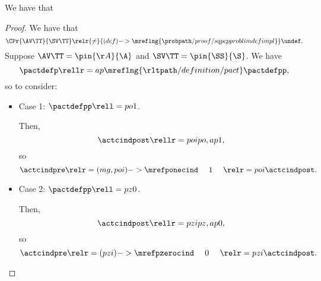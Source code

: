 \begin{proposition}
  We have that %
\end{proposition}

\begin{proof}
  We have that
  $$\CPr{\AV\TT}{\SV\TT} \relr {\ne} {(def)->\mreflng{\probpath/proof/sqpcpproblimdefimpl}} \undef,$$
  Suppose 
  $\AV\TT = \pin{\AA}{\A}$
  and
  $\SV\TT = \pin{\SS}{\S}$. We have
  $$\pactdefp \rellr = ap {\mreflng{\rltpath/definition/pact}} \pactdefpp,$$
  so  to consider:
  \begin{itemize}
    \item {} Case 1: $\pactdefpp \rell = po 1$.

      Then,
      $$\actcindpost \rellr = poi po,ap 1,$$
      so
      $$\actcindpre \relr = (mg,poi)->{\mrefponecind} \ \ \ \ 1\ \ \ \ \relr = poi \actcindpost.$$
    \item {} Case 2: $\pactdefpp \rell = pz 0$.

      Then,
      $$\actcindpost \rellr = pzi pz,ap 0,$$
      so
      $$\actcindpre \relr = (pzi)->{\mrefpzerocind} \ \ \ \ 0\ \ \ \ \relr = pzi \actcindpost.$$
  \end{itemize}
\end{proof}
